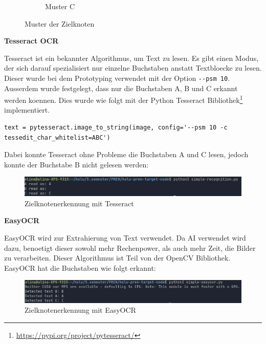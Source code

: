 \begin{figure}[H]
\begin{subfigure}{0.3\textwidth}
\caption{Muster C}
\label{fig:image-c}
\end{subfigure}

\caption{Muster der Zielknoten}
\label{fig:muster-zielknoten}
\end{figure}


\textbf{Tesseract OCR}

Tesseract ist ein bekannter Algorithmus, um Text zu lesen. Es gibt einen Modus, der sich darauf spezialisiert nur einzelne Buchstaben anstatt Textbloecke zu lesen. Dieser wurde bei dem Prototyping verwendet mit der Option \verb|--psm 10|. Ausserdem wurde festgelegt, dass nur die Buchstaben A, B und C erkannt werden koennen. Dies wurde wie folgt mit der Python Tesseract Bibliothek\footnote{\url{https://pypi.org/project/pytesseract/}} implementiert. 

\begin{verbatim}
text = pytesseract.image_to_string(image, config='--psm 10 -c tessedit_char_whitelist=ABC')
\end{verbatim}

Dabei konnte Tesseract ohne Probleme die Buchstaben A und C lesen, jedoch konnte der Buchstabe B nicht gelesen werden:

\begin{figure}[H]
\includegraphics[width=0.95\linewidth]{assets/informatik-prototyp/opencv/target_node_detection/tesseract.png} 
\caption{Zielknotenerkennung mit Tesseract}
\label{fig:zielknoten-tesseract}
\end{figure}


\textbf{EasyOCR}

EasyOCR wird zur Extrahierung von Text verwendet. Da AI verwendet wird dazu, benoetigt dieser sowohl mehr Rechenpower, als auch mehr Zeit, die Bilder zu verarbeiten. Dieser Algorithmus ist Teil von der OpenCV Bibliothek. EasyOCR hat die Buchstaben wie folgt erkannt:

\begin{figure}[H]
\includegraphics[width=0.95\linewidth]{assets/informatik-prototyp/opencv/target_node_detection/easyocr.png} 
\caption{Zielknotenerkennung mit EasyOCR}
\label{fig:zielknoten-easyocr}
\end{figure}

